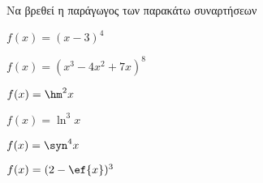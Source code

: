 Να βρεθεί η παράγωγος των παρακάτω συναρτήσεων
\begin{alist}
\item $ f(x)=(x-3)^4 $
\item $ f(x)=(x^3-4x^2+7x)^8 $
\item $ f(x)=\hm^2{x} $
\item $ f(x)=\ln^3{x} $
\item $ f(x)=\syn^4{x} $
\item $ f(x)=(2-\ef{x})^3 $
\end{alist}
